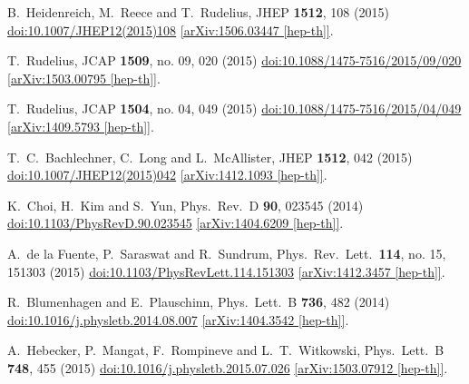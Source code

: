 \documentclass[12pt]{article}
\begin{document}
\begin{thebibliography}{99}
  B.~Heidenreich, M.~Reece and T.~Rudelius,
  JHEP {\bf 1512}, 108 (2015)
  \href{https://dx.doi.org/10.1007/JHEP12(2015)108}{doi:10.1007/JHEP12(2015)108}
  \href{https://arxiv.org/abs/1506.03447}{[arXiv:1506.03447 [hep-th]]}.

  T.~Rudelius,
  JCAP {\bf 1509}, no. 09, 020 (2015)
  \href{https://dx.doi.org/10.1088/1475-7516/2015/09/020}{doi:10.1088/1475-7516/2015/09/020}
  \href{https://arxiv.org/abs/1503.00795}{[arXiv:1503.00795 [hep-th]]}.

  T.~Rudelius,
  JCAP {\bf 1504}, no. 04, 049 (2015)
  \href{https://dx.doi.org/10.1088/1475-7516/2015/04/049}{doi:10.1088/1475-7516/2015/04/049}
  \href{https://arxiv.org/abs/1409.5793}{[arXiv:1409.5793 [hep-th]]}.

  T.~C.~Bachlechner, C.~Long and L.~McAllister,
  JHEP {\bf 1512}, 042 (2015)
  \href{https://dx.doi.org/10.1007/JHEP12(2015)042}{doi:10.1007/JHEP12(2015)042}
  \href{https://arxiv.org/abs/1412.1093}{[arXiv:1412.1093 [hep-th]]}.

  K.~Choi, H.~Kim and S.~Yun,
  Phys.\ Rev.\ D {\bf 90}, 023545 (2014)
  \href{https://dx.doi.org/10.1103/PhysRevD.90.023545}{doi:10.1103/PhysRevD.90.023545}
  \href{https://arxiv.org/abs/1404.6209}{[arXiv:1404.6209 [hep-th]]}.

  A.~de la Fuente, P.~Saraswat and R.~Sundrum,
  Phys.\ Rev.\ Lett.\  {\bf 114}, no. 15, 151303 (2015)
  \href{https://dx.doi.org/10.1103/PhysRevLett.114.151303}{doi:10.1103/PhysRevLett.114.151303}
  \href{https://arxiv.org/abs/1412.3457}{[arXiv:1412.3457 [hep-th]]}.

  R.~Blumenhagen and E.~Plauschinn,
  Phys.\ Lett.\ B {\bf 736}, 482 (2014)
  \href{https://dx.doi.org/10.1016/j.physletb.2014.08.007}{doi:10.1016/j.physletb.2014.08.007}
  \href{https://arxiv.org/abs/1404.3542}{[arXiv:1404.3542 [hep-th]]}.

  A.~Hebecker, P.~Mangat, F.~Rompineve and L.~T.~Witkowski,
  Phys.\ Lett.\ B {\bf 748}, 455 (2015)
  \href{https://dx.doi.org/10.1016/j.physletb.2015.07.026}{doi:10.1016/j.physletb.2015.07.026}
  \href{https://arxiv.org/abs/1503.07912}{[arXiv:1503.07912 [hep-th]]}.


\end{thebibliography}
\end{document}

